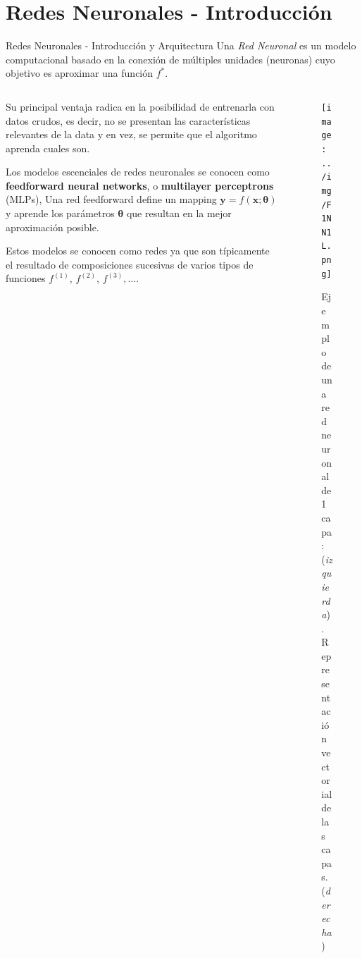 \documentclass[9pt]{beamer}
\begin{document}
\section{Redes Neuronales - Introducción}
\begin{frame}{Redes Neuronales - Introducción y Arquitectura}
Una \textit{Red Neuronal} es un modelo computacional basado en la conexión de múltiples unidades (neuronas) cuyo objetivo es aproximar una función $f^{*}$. \pause
\newline 

\begin{columns}

  \begin{column}{0.5\textwidth}

  Su principal ventaja radica en la posibilidad de entrenarla con datos crudos, es decir, no se presentan las características relevantes de la data y en vez, se permite que el algoritmo aprenda cuales son. \pause

  \vspace{0.2cm}
  Los modelos escenciales de redes neuronales se conocen como \textbf{feedforward neural networks}, o \textbf{multilayer perceptrons} (MLPs), Una red feedforward define un mapping $\bm{y}=f(\bm{x}; \bm{\theta})$ y aprende los parámetros $\bm{\theta}$ que resultan en la mejor aproximación posible. \pause 
  \vspace{0.2cm}

  Estos modelos se conocen como redes ya que son típicamente el resultado de composiciones sucesivas de varios tipos de funciones $f^{(1)}$, $f^{(2)}$, $f^{(3)}, \dots$. \pause 

  \end{column}

  \begin{column}{0.5\textwidth}
  \begin{figure}[H]
  \centering
  \texttt{[image: ../img/F1NN1L.png]}
  \caption{Ejemplo de una red neuronal de 1 capa: (\textit{izquierda}). \\  Representación vectorial de las capas. (\textit{derecha})}
  \end{figure}

  \end{column}

\end{columns}



\end{frame}
\end{document}
